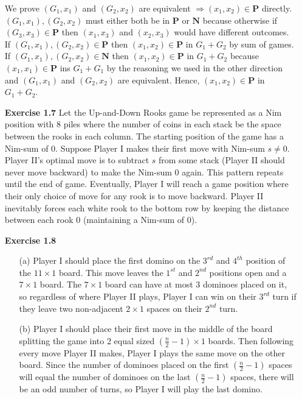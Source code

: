 \documentclass[10pt]{article}
\begin{document}
\begin{itemize}
We prove $(G_1,x_1)$ and $(G_2,x_2)$ are equivalent $\Rightarrow (x_1,x_2)\in\mathbf{P}$ directly. $(G_1,x_1),(G_2,x_2)$ must either both be in $\mathbf{P}$ or $\mathbf{N}$ because otherwise if $(G_3,x_3)\in\mathbf{P}$ then $(x_1,x_3)$ and $(x_2,x_3)$ would have different outcomes. If $(G_1,x_1),(G_2,x_2)\in\mathbf{P}$ then $(x_1,x_2)\in\mathbf{P}$ in $G_1+G_2$ by sum of games. If $(G_1,x_1),(G_2,x_2)\in\mathbf{N}$ then $(x_1,x_2)\in\mathbf{P}$ in $G_1+G_2$ because $(x_1,x_1)\in\mathbf{P}$ ins $G_1+G_1$ by the reasoning we used in the other direction and $(G_1,x_1)$ and $(G_2,x_2)$ are equivalent.
Hence, $(x_1,x_2)\in\mathbf{P}$ in $G_1+G_2$. 
\item [\textbf{Exercise 1.7}] Let the Up-and-Down Rooks game be represented as a Nim position with $8$ piles where the number of coins in each stack be the space between the rooks in each column. The starting position of the game has a Nim-sum of $0$. Suppose Player I makes their first move with Nim-sum $s\neq0$. Player II's optimal move is to subtract $s$ from some stack (Player II should never move backward) to make the Nim-sum $0$ again. This pattern repeats until the end of game. Eventually, Player I will reach a game position where their only choice of move for any rook is to move backward. Player II inevitably forces each white rook to the bottom row by keeping the distance between each rook $0$ (maintaining a Nim-sum of $0$).
\item [\textbf{Exercise 1.8}] \begin{itemize}
    \item [(a)] Player I should place the first domino on the $3^{rd}$ and $4^{th}$ position of the $11\times1$ board. This move leaves the $1^{st}$ and $2^{nd}$ positions open and a $7\times1$ board. The $7\times1$ board can have at most $3$ dominoes placed on it, so regardless of where Player II plays, Player I can win on their $3^{rd}$ turn if they leave two non-adjacent $2\times1$ spaces on their $2^{nd}$ turn.
    \item [(b)] Player I should place their first move in the middle of the board splitting the game into 2 equal sized $(\frac{n}{2}-1)\times1$ boards. Then following every move Player II makes, Player I plays the same move on the other board. Since the number of dominoes placed on the first $(\frac{n}{2}-1)$ spaces will equal the number of dominoes on the last $(\frac{n}{2}-1)$ spaces, there will be an odd number of turns, so Player I will play the last domino.
\end{itemize}
\end{itemize}
\end{document}
